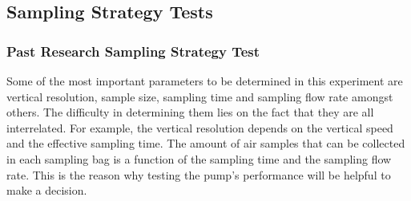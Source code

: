 \begin{table}[H]

\noindent{}

\caption{Pump Flowrate/Efficiency According to the Datasheet and Tests.}
\label{tab:pump-flowrate-efficiency}
\end{table}

\subsection{Sampling Strategy Tests}

\subsubsection{Past Research Sampling Strategy Test}
Some of the most important parameters to be determined in this experiment are vertical resolution, sample size, sampling time and sampling flow rate amongst others. The difficulty in determining them lies on the fact that they are all interrelated. For example, the vertical resolution depends on the vertical speed and the effective sampling time. The amount of air samples that can be collected in each sampling bag is a function of the sampling time and the sampling flow rate. This is the reason why testing the pump's performance will be helpful to make a decision.

